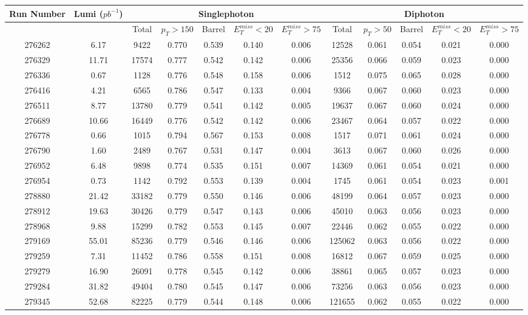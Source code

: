 \documentclass[10pt]{extarticle}
\begin{document}
\begin{longtable}{|c|c|c|c|c|c|c|c|c|c|c|c|}
\hline 
Run Number & Lumi ($pb^{-1}$) & \multicolumn{5}{|c|}{Singlephoton} & \multicolumn{5}{|c|}{Diphoton} \\ 
\hline 
 & & Total & $p_{T} > 150$ & Barrel & $E_{T}^{miss} < 20$ & $E_{T}^{miss} > 75$ & Total & $p_{T} > 50$ & Barrel & $E_{T}^{miss} < 20$ & $E_{T}^{miss} > 75$ \\ 
\hline 
276262&6.17&9422&0.770&0.539&0.140&0.006&12528&0.061&0.054&0.021&0.000 \\ 
\hline 
276329&11.71&17574&0.777&0.542&0.142&0.006&25356&0.066&0.059&0.023&0.000 \\ 
\hline 
276336&0.67&1128&0.776&0.548&0.158&0.006&1512&0.075&0.065&0.028&0.000 \\ 
\hline 
276416&4.21&6565&0.786&0.547&0.133&0.004&9366&0.067&0.060&0.023&0.000 \\ 
\hline 
276511&8.77&13780&0.779&0.541&0.142&0.005&19637&0.067&0.060&0.024&0.000 \\ 
\hline 
276689&10.66&16449&0.776&0.542&0.142&0.006&23467&0.064&0.057&0.022&0.000 \\ 
\hline 
276778&0.66&1015&0.794&0.567&0.153&0.008&1517&0.071&0.061&0.024&0.000 \\ 
\hline 
276790&1.60&2489&0.767&0.531&0.147&0.004&3613&0.067&0.060&0.026&0.000 \\ 
\hline 
276952&6.48&9898&0.774&0.535&0.151&0.007&14369&0.061&0.054&0.021&0.000 \\ 
\hline 
276954&0.73&1142&0.792&0.553&0.139&0.004&1745&0.061&0.054&0.023&0.001 \\ 
\hline 
278880&21.42&33182&0.779&0.550&0.146&0.006&48199&0.064&0.057&0.023&0.000 \\ 
\hline 
278912&19.63&30426&0.779&0.547&0.143&0.006&45010&0.063&0.056&0.023&0.000 \\ 
\hline 
278968&9.88&15299&0.782&0.553&0.145&0.007&22446&0.062&0.055&0.022&0.000 \\ 
\hline 
279169&55.01&85236&0.779&0.546&0.146&0.006&125062&0.063&0.056&0.022&0.000 \\ 
\hline 
279259&7.31&11452&0.786&0.558&0.151&0.008&16812&0.067&0.059&0.025&0.000 \\ 
\hline 
279279&16.90&26091&0.778&0.545&0.142&0.006&38861&0.065&0.057&0.023&0.000 \\ 
\hline 
279284&31.82&49404&0.780&0.545&0.147&0.006&73256&0.063&0.056&0.023&0.000 \\ 
\hline 
279345&52.68&82225&0.779&0.544&0.148&0.006&121655&0.062&0.055&0.022&0.000 \\ 

\end{longtable}
\end{document}

